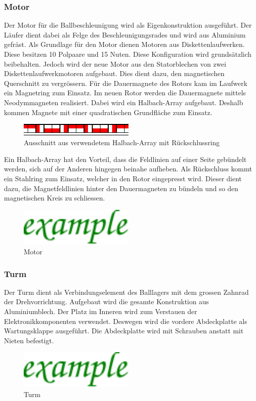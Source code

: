 \subsubsection{Motor}
Der Motor für die Ballbeschleunigung wird als Eigenkonstruktion ausgeführt.  
Der Läufer dient dabei als Felge des Beschleunigungsrades und wird aus 
Aluminium gefräst. Als Grundlage für den Motor dienen Motoren aus 
Diskettenlaufwerken. Diese besitzen 10 Polpaare und 15 Nuten. Diese 
Konfiguration wird grundsätzlich beibehalten. Jedoch wird der neue Motor aus 
den Statorblechen von zwei Diskettenlaufwerkmotoren aufgebaut. Dies dient 
dazu, den magnetischen Querschnitt zu vergrössern. Für die Dauermagnete des 
Rotors kam im Laufwerk ein Magnetring zum Einsatz. Im neuen Rotor werden die 
Dauermagnete mittels Neodymmagneten realisiert. Dabei wird ein Halbach-Array 
aufgebaut. Deshalb kommen Magnete mit einer quadratischen Grundfläche zum 
Einsatz. 
\begin{figure}[h!]
    \centering
    \includegraphics[width=0.5\textwidth]{fig/halbach.pdf}
    \caption{Ausschnitt aus verwendetem Halbach-Array mit Rückschlussring}
    \label{fig:halbach}
\end{figure}
Ein Halbach-Array hat den Vorteil, dass die Feldlinien auf einer 
Seite gebündelt werden, sich auf der Anderen hingegen beinahe aufheben. 
Als Rückschluss kommt ein Stahlring zum Einsatz, welcher in den Rotor 
eingepresst wird. Dieser dient dazu, die Magnetfeldlinien hinter den 
Dauermagneten zu bündeln und so den magnetischen Kreis zu schliessen. 

\begin{figure}[h!]
    \centering
    \includegraphics[width=0.5\textwidth]{../example/fig/example.pdf}
    \caption{Motor}
    \label{fig:motor}
\end{figure}

\subsubsection{Turm}
Der Turm dient als Verbindungselement des Balllagers mit dem grossen Zahnrad 
der Drehvorrichtung. Aufgebaut wird die gesamte Konstruktion aus 
Aluminiumblech. Der Platz im Inneren wird zum Verstauen der 
Elektronikkomponenten verwendet. Deswegen wird die vordere Abdeckplatte als 
Wartungsklappe ausgeführt. Die Abdeckplatte wird mit Schrauben anstatt mit 
Nieten befestigt.

\begin{figure}[h!]
    \centering
    \includegraphics[width=0.5\textwidth]{../example/fig/example.pdf}
    \caption{Turm}
    \label{fig:turm}
\end{figure}
